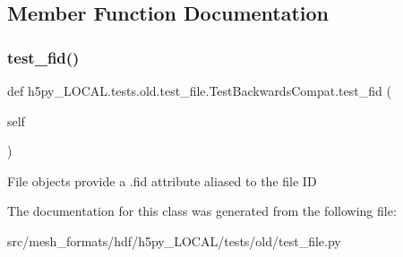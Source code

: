 \subsection{Member Function Documentation}
\mbox{\label{classh5py__LOCAL_1_1tests_1_1old_1_1test__file_1_1TestBackwardsCompat_acd78a372317ca86a990df43d22955039}} 
\subsubsection{\texorpdfstring{test\+\_\+fid()}{test\_fid()}}
{\footnotesize\ttfamily def h5py\+\_\+\+L\+O\+C\+A\+L.\+tests.\+old.\+test\+\_\+file.\+Test\+Backwards\+Compat.\+test\+\_\+fid (\begin{DoxyParamCaption}\item[{}]{self }\end{DoxyParamCaption})}

\begin{DoxyVerb}File objects provide a .fid attribute aliased to the file ID \end{DoxyVerb}
 

The documentation for this class was generated from the following file\+:\begin{DoxyCompactItemize}
\item 
src/mesh\+\_\+formats/hdf/h5py\+\_\+\+L\+O\+C\+A\+L/tests/old/test\+\_\+file.\+py\end{DoxyCompactItemize}
